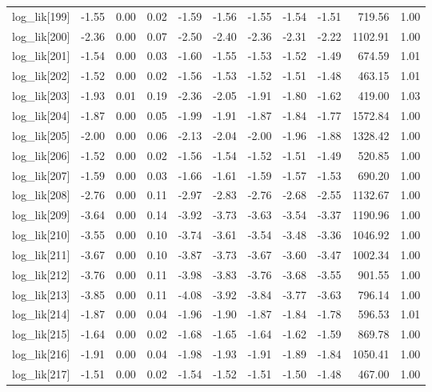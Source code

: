 \begin{table}[ht]
\begin{tabular}{rrrrrrrrrrr}
  log\_lik[199] & -1.55 & 0.00 & 0.02 & -1.59 & -1.56 & -1.55 & -1.54 & -1.51 & 719.56 & 1.00 \\ 
  log\_lik[200] & -2.36 & 0.00 & 0.07 & -2.50 & -2.40 & -2.36 & -2.31 & -2.22 & 1102.91 & 1.00 \\ 
  log\_lik[201] & -1.54 & 0.00 & 0.03 & -1.60 & -1.55 & -1.53 & -1.52 & -1.49 & 674.59 & 1.01 \\ 
  log\_lik[202] & -1.52 & 0.00 & 0.02 & -1.56 & -1.53 & -1.52 & -1.51 & -1.48 & 463.15 & 1.01 \\ 
  log\_lik[203] & -1.93 & 0.01 & 0.19 & -2.36 & -2.05 & -1.91 & -1.80 & -1.62 & 419.00 & 1.03 \\ 
  log\_lik[204] & -1.87 & 0.00 & 0.05 & -1.99 & -1.91 & -1.87 & -1.84 & -1.77 & 1572.84 & 1.00 \\ 
  log\_lik[205] & -2.00 & 0.00 & 0.06 & -2.13 & -2.04 & -2.00 & -1.96 & -1.88 & 1328.42 & 1.00 \\ 
  log\_lik[206] & -1.52 & 0.00 & 0.02 & -1.56 & -1.54 & -1.52 & -1.51 & -1.49 & 520.85 & 1.00 \\ 
  log\_lik[207] & -1.59 & 0.00 & 0.03 & -1.66 & -1.61 & -1.59 & -1.57 & -1.53 & 690.20 & 1.00 \\ 
  log\_lik[208] & -2.76 & 0.00 & 0.11 & -2.97 & -2.83 & -2.76 & -2.68 & -2.55 & 1132.67 & 1.00 \\ 
  log\_lik[209] & -3.64 & 0.00 & 0.14 & -3.92 & -3.73 & -3.63 & -3.54 & -3.37 & 1190.96 & 1.00 \\ 
  log\_lik[210] & -3.55 & 0.00 & 0.10 & -3.74 & -3.61 & -3.54 & -3.48 & -3.36 & 1046.92 & 1.00 \\ 
  log\_lik[211] & -3.67 & 0.00 & 0.10 & -3.87 & -3.73 & -3.67 & -3.60 & -3.47 & 1002.34 & 1.00 \\ 
  log\_lik[212] & -3.76 & 0.00 & 0.11 & -3.98 & -3.83 & -3.76 & -3.68 & -3.55 & 901.55 & 1.00 \\ 
  log\_lik[213] & -3.85 & 0.00 & 0.11 & -4.08 & -3.92 & -3.84 & -3.77 & -3.63 & 796.14 & 1.00 \\ 
  log\_lik[214] & -1.87 & 0.00 & 0.04 & -1.96 & -1.90 & -1.87 & -1.84 & -1.78 & 596.53 & 1.01 \\ 
  log\_lik[215] & -1.64 & 0.00 & 0.02 & -1.68 & -1.65 & -1.64 & -1.62 & -1.59 & 869.78 & 1.00 \\ 
  log\_lik[216] & -1.91 & 0.00 & 0.04 & -1.98 & -1.93 & -1.91 & -1.89 & -1.84 & 1050.41 & 1.00 \\ 
  log\_lik[217] & -1.51 & 0.00 & 0.02 & -1.54 & -1.52 & -1.51 & -1.50 & -1.48 & 467.00 & 1.00 \\ 

\end{tabular}
\end{table}
